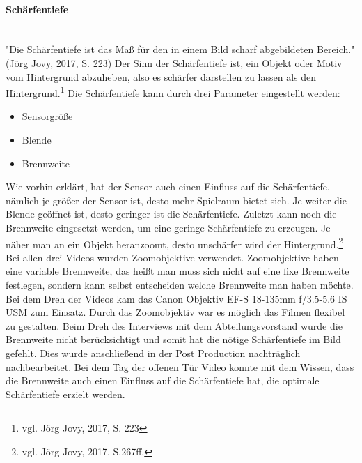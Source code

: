\paragraph{Schärfentiefe}
\leavevmode \\
"Die Schärfentiefe ist das Maß für den in einem Bild scharf abgebildeten Bereich." (Jörg Jovy, 2017, S. 223)\newline
Der Sinn der Schärfentiefe ist, ein Objekt oder Motiv vom Hintergrund abzuheben, also es schärfer darstellen zu lassen als den Hintergrund.\footnote{\label{}vgl. Jörg Jovy, 2017, S. 223}\newline
Die Schärfentiefe kann durch drei Parameter eingestellt werden:
\begin{itemize}
	\item Sensorgröße
	\item Blende
	\item Brennweite
\end{itemize}
Wie vorhin erklärt, hat der Sensor auch einen Einfluss auf die Schärfentiefe, nämlich je größer der Sensor ist, desto mehr Spielraum bietet sich.\newline
Je weiter die Blende geöffnet ist, desto geringer ist die Schärfentiefe. Zuletzt kann noch die Brennweite eingesetzt werden, um eine geringe Schärfentiefe zu erzeugen. Je näher man an ein Objekt heranzoomt, desto unschärfer wird der Hintergrund.\footnote{\label{}vgl. Jörg Jovy, 2017, S.267ff.}\newline 
Bei allen drei Videos wurden Zoomobjektive verwendet. Zoomobjektive haben eine variable Brennweite, das heißt man muss sich nicht auf eine fixe Brennweite festlegen, sondern kann selbst entscheiden welche Brennweite man haben möchte. Bei dem Dreh der Videos kam das Canon Objektiv EF-S 18-135mm f/3.5-5.6 IS USM zum Einsatz. Durch das Zoomobjektiv war es möglich das Filmen flexibel zu gestalten.\newline
Beim Dreh des Interviews mit dem Abteilungsvorstand wurde die Brennweite nicht berücksichtigt und somit hat die nötige Schärfentiefe im Bild gefehlt. Dies wurde anschließend in der Post Production nachträglich nachbearbeitet. Bei dem Tag der offenen Tür Video konnte mit dem Wissen, dass die Brennweite auch einen Einfluss auf die Schärfentiefe hat, die optimale Schärfentiefe erzielt werden.